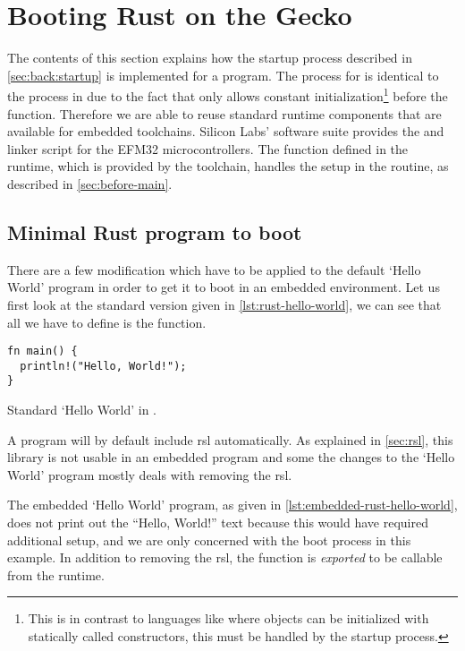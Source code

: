 \section{Booting Rust on the Gecko}
\label{sec:impl:booting}

The contents of this section explains how the startup process described in \autoref{sec:back:startup} is implemented for a {\rust} program.
The process for {\rust} is identical to the process in {\C} due to the fact that {\rust} only allows constant initialization\footnote{This is in contrast to languages like {\Cpp} where objects can be initialized with statically called constructors, this must be handled by the startup process.} before the {\main} function.
Therefore we are able to reuse standard runtime components that are available for {\C} embedded toolchains.
Silicon Labs' software suite provides the  and linker script for the EFM32 microcontrollers.
The  function defined in the {\C} runtime, which is provided by the {\armgcc} toolchain, handles the setup in the  routine, as described in \autoref{sec:before-main}.

\subsection{Minimal Rust program to boot}
\label{ssec:minimal_rust_program_to_boot}

There are a few modification which have to be applied to the default `Hello World' program in order to get it to boot in an embedded environment.
Let us first look at the standard version given in \autoref{lst:rust-hello-world}, we can see that all we have to define is the  function.

\begin{listing}[H]
  \begin{verbatim}
fn main() {
  println!("Hello, World!");
}
  \end{verbatim}
  \caption{Standard `Hello World' in {\rust}.}
  \label{lst:rust-hello-world}
\end{listing}

A {\rust} program will by default include \gls{rsl} automatically.
As explained in \autoref{sec:rsl}, this library is not usable in an embedded program and some the changes to the `Hello World' program mostly deals with removing the \gls{rsl}.

The embedded `Hello World' program, as given in \autoref{lst:embedded-rust-hello-world}, does not print out the ``Hello, World!'' text because this would have required additional setup, and we are only concerned with the boot process in this example.
In addition to removing the \gls{rsl}, the {\main} function is \emph{exported} to be callable from the {\C} runtime.

